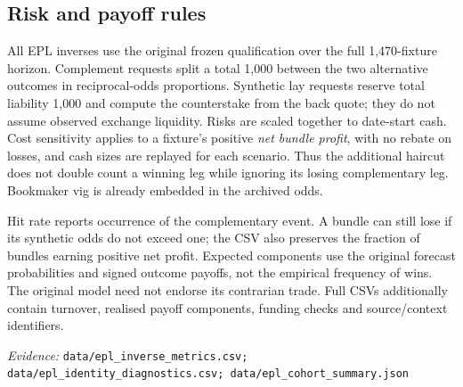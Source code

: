 \documentclass[11pt,letterpaper]{article}
\newcommand{\sourcefile}[1]{{\small\color{muted}\textit{Evidence:} \nolinkurl{#1}\par}}
\begin{document}
{\footnotesize\setlength{\tabcolsep}{3pt}
}

\subsection{Risk and payoff rules}
All EPL inverses use the original frozen qualification over the full
1,470-fixture horizon. Complement requests split a total 1,000 between the
two alternative outcomes in reciprocal-odds proportions. Synthetic lay
requests reserve total liability 1,000 and compute the counterstake from
the back quote; they do not assume observed exchange liquidity. Risks are
scaled together to date-start cash. Cost sensitivity applies to a fixture's
positive \emph{net bundle profit}, with no rebate on losses, and cash sizes
are replayed for each scenario. Thus the additional haircut does not double
count a winning leg while ignoring its losing complementary leg. Bookmaker
vig is already embedded in the archived odds.

Hit rate reports occurrence of the complementary event. A bundle can still
lose if its synthetic odds do not exceed one; the CSV also preserves the
fraction of bundles earning positive net profit. Expected components use
the original forecast probabilities and signed outcome payoffs, not the
empirical frequency of wins. The original model need not endorse its
contrarian trade. Full CSVs additionally contain turnover, realised payoff
components, funding checks and source/context identifiers.

{\scriptsize\setlength{\tabcolsep}{2pt}
}
\sourcefile{data/epl_inverse_metrics.csv; data/epl_identity_diagnostics.csv; data/epl_cohort_summary.json}
\end{document}
